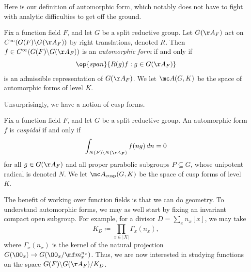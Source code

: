 \documentclass[../notes.tex]{subfiles}
\begin{document}
Here is our definition of automorphic form, which notably does not have to fight with analytic difficulties to get off the ground.
\begin{definition}
	Fix a function field $F$, and let $G$ be a split reductive group. Let $G(\AA_F)$ act on $C^\infty(G(F)\backslash G(\AA_F))$ by right translations, denoted $R$. Then $f\in C^\infty(G(F)\backslash G(\AA_F))$ is an \textit{automorphic form} if and only if
	\[\op{span}\{R(g)f:g\in G(\AA_F)\}\]
	is an admissible representation of $G(\AA_F)$. We let $\mc A(G,K)$ be the space of automorphic forms of level $K$.
\end{definition}
Unsurprisingly, we have a notion of cusp forms.
\begin{definition}[cuspidal]
	Fix a function field $F$, and let $G$ be a split reductive group. An automorphic form $f$ is \textit{cuspidal} if and only if
	\[\int_{N(F)\backslash N(\AA_F)}f(ng)\,dn=0\]
	for all $g\in G(\AA_F)$ and all proper parabolic subgroups $P\subseteq G$, whose unipotent radical is denoted $N$. We let $\mc A_{\mathrm{cusp}}(G,K)$ be the space of cusp forms of level $K$.
\end{definition}
The benefit of working over function fields is that we can do geometry. To understand automorphic forms, we may as well start by fixing an invariant compact open subgroup. For example, for a divisor $D=\sum_xn_x[x]$, we may take
\[K_D\coloneqq\prod_{x\in\left|X\right|}\Gamma_x(n_x),\]
where $\Gamma_x(n_x)$ is the kernel of the natural projection $G(\OO_x)\to G(\OO_x/\mf m_x^{n_x})$. Thus, we are now interested in studying functions on the space $G(F)\backslash G(\AA_F)/K_D$.
\end{document}
